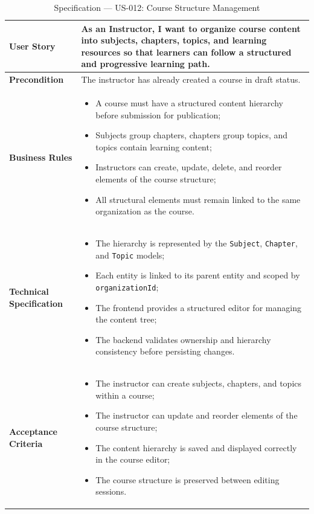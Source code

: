 \begin{table}[H]
\centering
\caption{Specification — US-012: Course Structure Management}
\label{tab:us012}
\renewcommand{\arraystretch}{1}
\begin{tabularx}{\textwidth}{|p{2.5cm}|X|}
\hline
\textbf{User Story} & As an Instructor, I want to organize course content into subjects, chapters, topics, and learning resources so that learners can follow a structured and progressive learning path. \\
\hline
\textbf{Precondition} & The instructor has already created a course in draft status. \\
\hline
\textbf{Business Rules} &
\begin{itemize}
  \item A course must have a structured content hierarchy before submission for publication;
  \item Subjects group chapters, chapters group topics, and topics contain learning content;
  \item Instructors can create, update, delete, and reorder elements of the course structure;
  \item All structural elements must remain linked to the same organization as the course.
\end{itemize} \\
\hline
\textbf{Technical Specification} &
\begin{itemize}
  \item The hierarchy is represented by the \texttt{Subject}, \texttt{Chapter}, and \texttt{Topic} models;
  \item Each entity is linked to its parent entity and scoped by \texttt{organizationId};
  \item The frontend provides a structured editor for managing the content tree;
  \item The backend validates ownership and hierarchy consistency before persisting changes.
\end{itemize} \\
\hline
\textbf{Acceptance Criteria} &
\begin{itemize}
  \item The instructor can create subjects, chapters, and topics within a course;
  \item The instructor can update and reorder elements of the course structure;
  \item The content hierarchy is saved and displayed correctly in the course editor;
  \item The course structure is preserved between editing sessions.
\end{itemize} \\
\hline
\end{tabularx}
\end{table}

